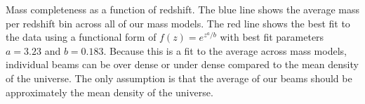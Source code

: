 \label{fig:mass_complete} Mass completeness as a function of redshift. The blue line shows the average mass per redshift bin across all of our mass models. The red line shows the best fit to the data using a functional form of $f(z) = e^{z^a / b}$ with best fit parameters $a = 3.23$ and $b = 0.183$. Because this is a fit to the average across mass models, individual beams can be over dense or under dense compared to the mean density of the universe. The only assumption is that the average of our beams should be approximately the mean density of the universe.